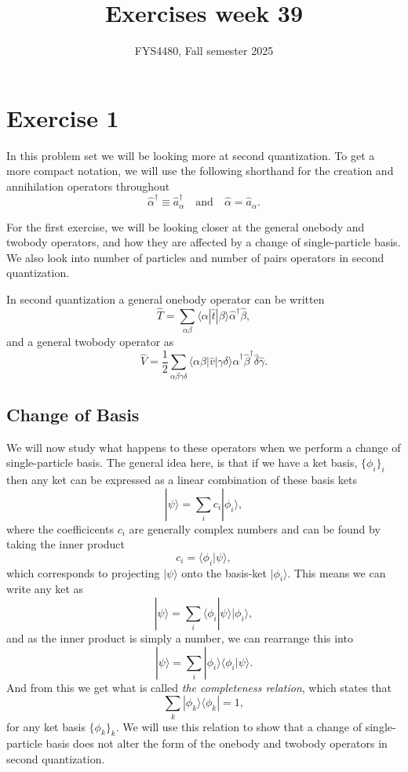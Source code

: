 \documentclass[a4paper, 11pt, notitlepage, english]{article}
\title{Exercises week 39}
\author{FYS4480, Fall semester 2025}
\newcommand{\bra}[1]{\langle #1|}
\newcommand{\ket}[1]{|#1 \rangle}
\newcommand{\braket}[2]{\langle #1 | #2 \rangle}
\newcommand{\op}[1]{\hat{#1}}
\newcommand{\braopket}[3]{\langle #1 | {#2} | #3 \rangle}
\newcommand{\ketbra}[2]{\ket{#1}\bra{#2}}
\begin{document}
\maketitle

\section*{Exercise 1}

In this problem set we will be looking more at second quantization. To get a more compact notation, we will use the following shorthand for the creation and annihilation operators throughout
$$\op{\alpha}^\dag \equiv \op{a}_\alpha^\dag \quad \mbox{and} \quad \op{\alpha} = \op{a}_\alpha.$$

For the first exercise, we will be looking closer at the general onebody and twobody operators, and how they are affected by a change of single-particle basis. We also look into number of particles and number of pairs operators in second quantization.

In second quantization a general onebody operator can be written
$$\op{T} = \sum_{\alpha\beta} \braopket{\alpha}{\op{t}}{\beta} \op{\alpha}^\dag \op{\beta},$$
and a general twobody operator as
$$\op{V} = \frac{1}{2}\sum_{\alpha\beta\gamma\delta} \braopket{\alpha\beta}{\op{v}}{\gamma\delta} \op{\alpha}^\dag \op{\beta}^\dag \op{\delta} \op{\gamma}.$$

\subsection*{Change of Basis}
We will now study what happens to these operators when we perform a change of single-particle basis. The general idea here, is that if we have a ket basis, $\{\phi_i\}_i$ then any ket can be expressed as a linear combination of these basis kets
$$\ket{\psi} = \sum_i c_i \ket{\phi_i},$$
where the coefficicents $c_i$ are generally complex numbers and can be found by taking the inner product 
$$c_i = \braket{\phi_i}{\psi},$$
which corresponds to projecting $\ket{\psi}$ onto the basis-ket $\ket{\phi_i}$. This means we can write any ket as
$$\ket{\psi} = \sum_i  \braket{\phi_i}{\psi}\ket{\phi_i},$$
and as the inner product is simply a number, we can rearrange this into
$$\ket{\psi} = \sum_i  \ket{\phi_i}\braket{\phi_i}{\psi}.$$
And from this we get what is called \emph{the completeness relation}, which states that 
$$\sum_k \ketbra{\phi_k}{\phi_k} = 1,$$
for any ket basis $\{\phi_k\}_k$. We will use this relation to show that a change of single-particle basis does not alter the form of the onebody and twobody operators in second quantization.
\end{document}
